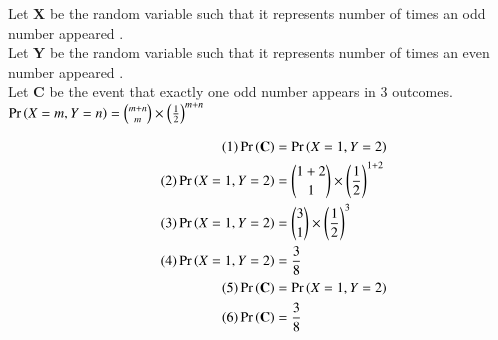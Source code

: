 
     Let \textbf{X} be the random variable such that it  represents  number of times an odd number appeared .\\
      Let \textbf{Y} be the random variable such that it  represents  number of times an even number appeared .\\
     Let \textbf{C}  be the event that exactly one odd number appears in 3 outcomes.\\
   $\Pr\left(X=m,Y=n\right)=\binom{m+n}{m}\times\left(\frac{1}{2}\right)^{m+n}$
   

    \begin{align}
    \centering
    \tag{1}
  \Pr\brak{\textbf{C}}&=\Pr\brak{X=1,Y=2}\label{cs1999-1:eq1}\\
  \tag{2}
  \Pr\brak{X=1,Y=2}&=\binom{1+2}{1}\times\brak{\frac{1}{2}}^{1+2}\label{cs1999-1:eq2}\\
  \tag{3}
  \Pr\brak{X=1,Y=2}&=\binom{3}{1}\times\brak{\frac{1}{2}}^{3}\label{cs1999-1:eq3}\\
  \tag{4}
  \Pr\brak{X=1,Y=2}&=\frac{3}{8}\label{cs1999-1:eq4}\\
  \tag{5}
 \Pr\brak{\textbf{C}}&=\Pr\brak{X=1,Y=2}\label{cs1999-1:eq5}\\
  \tag{6}
  \Pr\brak{\textbf{C}}&=\frac{3}{8}\label{cs1999-1:eq6}
   \end{align}
